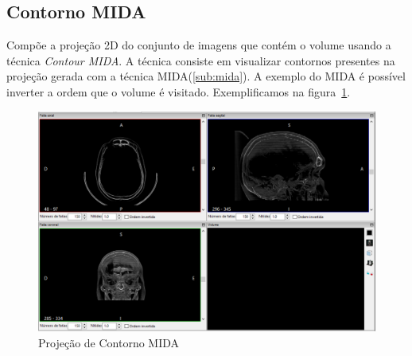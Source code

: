 \subsection{Contorno MIDA}

Compõe a projeção 2D do conjunto de imagens que contém o volume usando a técnica \textit{Contour MIDA}. A técnica consiste em visualizar contornos presentes na projeção gerada com a técnica MIDA(\ref{sub:mida}). A exemplo do MIDA é possível inverter a ordem que o volume é visitado. Exemplificamos na figura~\ref{fig:proj_contorno_mida}.

\begin{figure}[H]
\centering
\includegraphics[scale=0.40]{../user_guide_figures/invesalius_screen/multiplanar_window_contour_mida_pt.png}
\caption{Projeção de Contorno MIDA}
\label{fig:proj_contorno_mida}
\end{figure}
